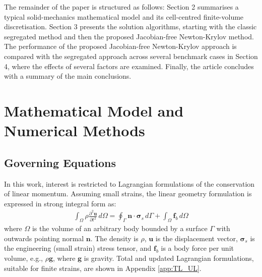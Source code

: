 \documentclass[sn-mathphys,Numbered]{sn-jnl}%
\newcommand{\bb}{\boldsymbol}
\begin{document}
The remainder of the paper is structured as follows:
Section 2 summarises a typical solid-mechanics mathematical model and its cell-centred finite-volume discretisation.
Section 3 presents the solution algorithms, starting with the classic segregated method and then the proposed Jacobian-free Newton-Krylov method.
The performance of the proposed Jacobian-free Newton-Krylov approach is compared with the segregated approach across several benchmark cases in Section 4, where the effects of several factors are examined. %
Finally, the article concludes with a summary of the main conclusions.


\section{Mathematical Model and Numerical Methods}\label{sec:math_model}

%

\subsection{Governing Equations} \label{sec:governing_eqn}

In this work, interest is restricted to Lagrangian formulations of the conservation of linear momentum.
Assuming small strains, the linear geometry formulation is expressed in strong integral form as:
\begin{eqnarray} \label{eqn:momentum_lingeom}
    \int_{\Omega} \rho \frac{\partial^2 \bb{u} }{\partial t^2} \, d\Omega
    =
    \oint_{\Gamma} \bb{n} \cdot \bb{\sigma}_s \,  d\Gamma
    + \int_{\Omega}  \bb{f}_b \, d\Omega
\end{eqnarray}
where $\Omega$ is the volume of an arbitrary body bounded by a surface $\Gamma$ with outwards pointing normal $\bb{n}$.
The density is $\rho$, $\bb{u}$ is the displacement vector, $\bb{\sigma}_s$ is the engineering (small strain) stress tensor, and $\bb{f}_b$ is a body force per unit volume, e.g., $\rho \bb{g}$, where $\bb{g}$ is gravity.
Total and updated Lagrangian formulations, suitable for finite strains, are shown in Appendix \ref{app:TL_UL}.
\end{document}
